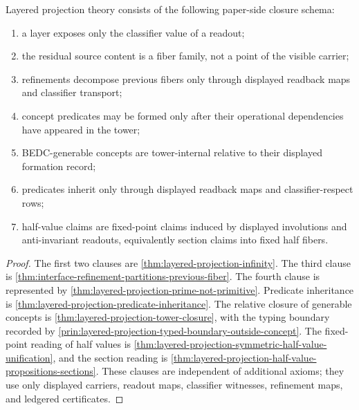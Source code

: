 \begin{theorem}
\label{thm:layered-projection-synthesis}
Layered projection theory consists of the following paper-side closure
schema:
\begin{enumerate}
\item a layer exposes only the classifier value of a readout;
\item the residual source content is a fiber family, not a point of the
visible carrier;
\item refinements decompose previous fibers only through displayed
readback maps and classifier transport;
\item concept predicates may be formed only after their operational
dependencies have appeared in the tower;
\item BEDC-generable concepts are tower-internal relative to their
displayed formation record;
\item predicates inherit only through displayed readback maps and
classifier-respect rows;
\item half-value claims are fixed-point claims induced by displayed
involutions and anti-invariant readouts, equivalently section claims into
fixed half fibers.
\end{enumerate}
\end{theorem}

\begin{proof}
The first two clauses are \autoref{thm:layered-projection-infinity}. The
third clause is \autoref{thm:interface-refinement-partitions-previous-fiber}.
The fourth clause is represented by
\autoref{thm:layered-projection-prime-not-primitive}. Predicate
inheritance is \autoref{thm:layered-projection-predicate-inheritance}. The
relative closure of generable concepts is
\autoref{thm:layered-projection-tower-closure}, with the typing boundary
recorded by
\autoref{prin:layered-projection-typed-boundary-outside-concept}. The
fixed-point reading of half values is
\autoref{thm:layered-projection-symmetric-half-value-unification}, and the
section reading is
\autoref{thm:layered-projection-half-value-propositions-sections}. These
clauses are independent of additional axioms; they use only displayed
carriers, readout maps, classifier witnesses, refinement maps, and
ledgered certificates.
\end{proof}
